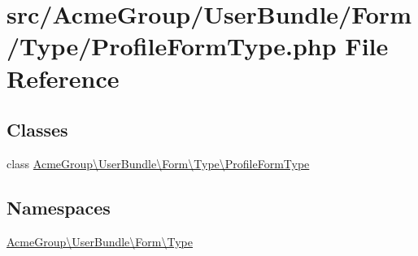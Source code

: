 \hypertarget{_profile_form_type_8php}{\section{src/\+Acme\+Group/\+User\+Bundle/\+Form/\+Type/\+Profile\+Form\+Type.php File Reference}
\label{_profile_form_type_8php}
}
\subsection*{Classes}
\begin{DoxyCompactItemize}
\item 
class \hyperlink{class_acme_group_1_1_user_bundle_1_1_form_1_1_type_1_1_profile_form_type}{Acme\+Group\textbackslash{}\+User\+Bundle\textbackslash{}\+Form\textbackslash{}\+Type\textbackslash{}\+Profile\+Form\+Type}
\end{DoxyCompactItemize}
\subsection*{Namespaces}
\begin{DoxyCompactItemize}
\item 
 \hyperlink{namespace_acme_group_1_1_user_bundle_1_1_form_1_1_type}{Acme\+Group\textbackslash{}\+User\+Bundle\textbackslash{}\+Form\textbackslash{}\+Type}
\end{DoxyCompactItemize}
